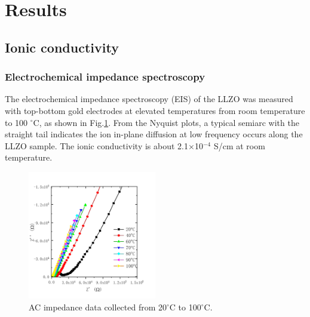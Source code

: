 \documentclass[twoside,twocolumn,9pt]{article}
\begin{document}
%

%

\section{Results}

\subsection{Ionic conductivity}

\subsubsection{Electrochemical impedance spectroscopy}

The electrochemical impedance spectroscopy (EIS) of the LLZO was measured with top-bottom gold electrodes at elevated temperatures from room temperature to 100 $^\circ$C, as shown in  Fig.\ref{fig:impedance}.
From the Nyquist plots, a typical semiarc with the straight tail indicates the ion in-plane diffusion at low frequency occurs along the LLZO sample.
The ionic conductivity is about 2.1$\times$10$^{-4}$ S/cm at room temperature.

\begin{figure}[t]
\centering
\includegraphics[width=0.5\textwidth]{Pics/Nyquist.pdf}
\caption{AC impedance data collected from 20$^\circ$C to 100$^\circ$C.}
\label{fig:impedance}
\end{figure}
\end{document}
